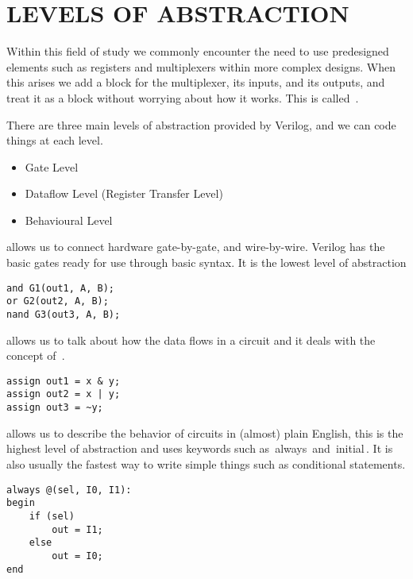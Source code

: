 \documentclass[]{report}
\newcommand{\keyword}[1]{{{\color{green}{#1}\,}}}
\newcommand{\code}[1]{{\ttfamily\color{blue!55!green}\,{#1}\,}}
\renewcommand{\emph}[1]{} %
\begin{document}
\section{LEVELS OF ABSTRACTION}

Within this field of study we commonly encounter the need to use predesigned elements such as registers and multiplexers within more complex designs. When this arises we add a block for the multiplexer, its inputs, and its outputs, and treat it as a block without worrying about how it works. This is called \keyword{abstraction}.

There are three main levels of abstraction provided by Verilog, and we can code things at each level.
\begin{itemize}
	\item Gate Level
	\item Dataflow Level (Register Transfer Level)
	\item Behavioural Level
\end{itemize}

\emph{Gate Level Modeling} allows us to connect hardware gate-by-gate, and wire-by-wire. Verilog has the basic gates ready for use through basic syntax. It is the lowest level of abstraction

\begin{lstlisting}[caption={Basic Gate Level Modeling},label={lst1}]
and G1(out1, A, B);
or G2(out2, A, B);
nand G3(out3, A, B);
\end{lstlisting}

\emph{Register Transfer Level Modeling} allows us to talk about how the data flows in a circuit and it deals with the concept of \keyword{continuous assignment}.

\begin{lstlisting}[caption={Basic RTL Modeling}, label={lst2}]
assign out1 = x & y;
assign out2 = x | y;
assign out3 = ~y;
\end{lstlisting}

\emph{Behavioral Modeling} allows us to describe the behavior of circuits in (almost) plain English, this is the highest level of abstraction and uses keywords such as \code{always} and \code{initial}. It is also usually the fastest way to write simple things such as conditional statements.

\begin{lstlisting}[caption={Basic Behavioral Modeling}, label={lst3}]
always @(sel, I0, I1):
begin
	if (sel)
		out = I1;
	else
		out = I0;
end
\end{lstlisting}
\end{document}
